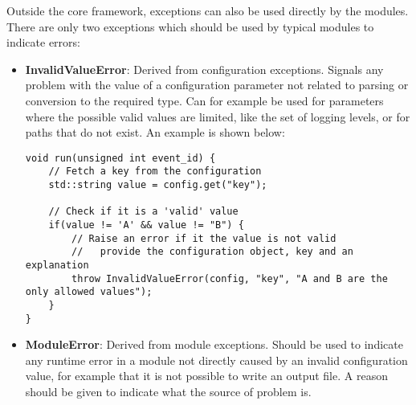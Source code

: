 Outside the core framework, exceptions can also be used directly by the modules.
There are only two exceptions which should be used by typical modules to indicate errors:
\begin{itemize}
\item \textbf{InvalidValueError}: Derived from configuration exceptions.
Signals any problem with the value of a configuration parameter not related to parsing or conversion to the required type.
Can for example be used for parameters where the possible valid values are limited, like the set of logging levels, or for paths that do not exist.
An example is shown below:
\begin{verbatim}
void run(unsigned int event_id) {
    // Fetch a key from the configuration
    std::string value = config.get("key");

    // Check if it is a 'valid' value
    if(value != 'A' && value != "B") {
        // Raise an error if it the value is not valid
        //   provide the configuration object, key and an explanation
        throw InvalidValueError(config, "key", "A and B are the only allowed values");
    }
}
\end{verbatim}
\item \textbf{ModuleError}: Derived from module exceptions.
Should be used to indicate any runtime error in a module not directly caused by an invalid configuration value, for example that it is not possible to write an output file.
A reason should be given to indicate what the source of problem is.
\end{itemize}

